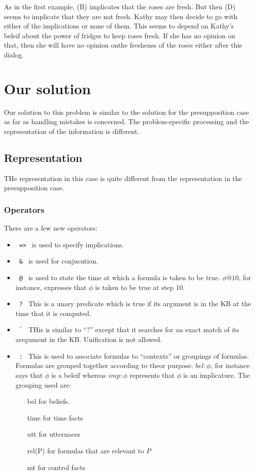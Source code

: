 \documentclass{article}
\begin{document}
As in the first example, (B) implicates that the roses are fresh. But
then (D) seems to implicate that they are not fresh. Kathy may then
decide to go with either of the implications or none of
them. This seems to depend on Kathy's beleif about the power of
fridges to keep roses fresh. If she has no opinion on that, then she
will have no opinion onthe freshenss of the roses either after this
dialog. 


\section{Our solution}

Our solution to this problem is similar to the solution for the
presupposition case as far as handling mistakes is concerned. The
problem-specific processing and the representation of the information
is different.

\subsection{Representation}

THe representation in this case is quite different from the
representation in the presupposition case. 

\subsubsection{Operators}

There are a few new operators:
\begin{itemize}
\item \verb+ => + is used to specify implications. 
\item \verb+ & + is used for conjucntion.
\item \verb+ @ + is used to state the time at which a formula is
taken to be true. $\phi@10$, for instance, expresses that $\phi$ is
taken to be true at step 10.
\item \verb+ ? + This is a unary predicate which is true if its argument is in
the KB at the time that it is computed.
\item \verb+ ` + THis is similar to ``?'' except that it searches for an
exact match of its aregument in the KB. Unification is not allowed.
\item \verb+ : + This is used to associate formulas to ``contexts'' or
groupings of formulas. Formulas are grouped together according to
theor purpose. $bel:\phi$, for instance says that $\phi$ is a beleif
whereas $imp:\phi$ represents that $\phi$ is an implicature. The
grouping used are:
\begin{itemize}
\item [bel] for beliefs.
\item [time] for time facts
\item [utt] for utternaces
\item [rel(P)] for formulas that are relevant to $P$
\item [mt] for control facts
\end{itemize}
\end{itemize}
\end{document}

